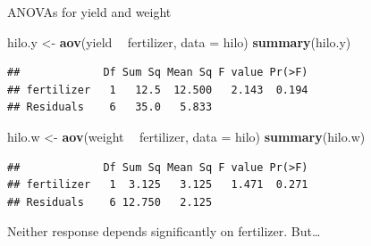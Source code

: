 \documentclass[
  ignorenonframetext,
]{beamer}
\newenvironment{Shaded}{\begin{snugshade}}{\end{snugshade}}
\newcommand{\DataTypeTok}[1]{\textcolor[rgb]{0.13,0.29,0.53}{#1}}
\newcommand{\KeywordTok}[1]{\textcolor[rgb]{0.13,0.29,0.53}{\textbf{#1}}}
\newcommand{\NormalTok}[1]{#1}
\newcommand{\OperatorTok}[1]{\textcolor[rgb]{0.81,0.36,0.00}{\textbf{#1}}}
\newcommand{\StringTok}[1]{\textcolor[rgb]{0.31,0.60,0.02}{#1}}
\begin{document}
\begin{frame}[fragile]{ANOVAs for yield and weight}
\protect\hypertarget{anovas-for-yield-and-weight}{}

\small

\begin{Shaded}
\begin{Highlighting}[]
\NormalTok{hilo.y <-}\StringTok{ }\KeywordTok{aov}\NormalTok{(yield }\OperatorTok{~}\StringTok{ }\NormalTok{fertilizer, }\DataTypeTok{data =}\NormalTok{ hilo)}
\KeywordTok{summary}\NormalTok{(hilo.y)}
\end{Highlighting}
\end{Shaded}

\begin{verbatim}
##             Df Sum Sq Mean Sq F value Pr(>F)
## fertilizer   1   12.5  12.500   2.143  0.194
## Residuals    6   35.0   5.833
\end{verbatim}

\begin{Shaded}
\begin{Highlighting}[]
\NormalTok{hilo.w <-}\StringTok{ }\KeywordTok{aov}\NormalTok{(weight }\OperatorTok{~}\StringTok{ }\NormalTok{fertilizer, }\DataTypeTok{data =}\NormalTok{ hilo)}
\KeywordTok{summary}\NormalTok{(hilo.w)}
\end{Highlighting}
\end{Shaded}

\begin{verbatim}
##             Df Sum Sq Mean Sq F value Pr(>F)
## fertilizer   1  3.125   3.125   1.471  0.271
## Residuals    6 12.750   2.125
\end{verbatim}

\normalsize

Neither response depends significantly on fertilizer. But\ldots

\end{frame}
\end{document}
